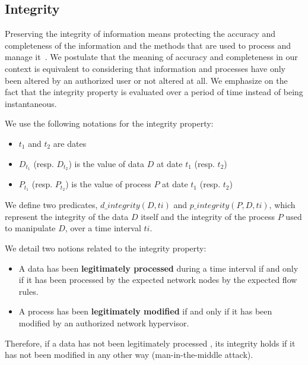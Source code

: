 \subsection{Integrity}
\label{sec:prop-int}
Preserving the integrity of information means protecting the accuracy and completeness of the information and the methods that are used to process and manage it~\cite{ISO/IEC270012013}.
We postulate that the meaning of accuracy and completeness in our context is equivalent to considering that information and processes have only been altered by an authorized user or not altered at all.
We emphasize on the fact that the integrity property is evaluated over a period of time instead of being instantaneous.

We use the following notations for the integrity property:

\begin{itemize}
    \item $t_1$ and $t_2$ are dates
    \item $D_{t_1}$ (resp. $D_{t_2}$) is the value of data $D$ at date $t_1$ (resp. $t_2$)
    \item $P_{t_1}$ (resp. $P_{t_2}$) is the value of process $P$ at date $t_1$ (resp. $t_2$)
\end{itemize}

We define two predicates, $d\_integrity(D,ti)$ and $p\_integrity(P,D,ti)$, which represent  the integrity of the data $D$ itself and the integrity of the process $P$ used to manipulate $D$, over a time interval $ti$. 

We detail two notions related to the integrity property:
\begin{itemize}
    \item A data has been \textbf{legitimately processed} during a time interval if and only if it has been processed by the expected network nodes by the expected flow rules.
    \item A process has been \textbf{legitimately modified} if and only if it has been modified by an authorized network hypervisor.
\end{itemize}


Therefore, if a data has not been legitimately processed , its integrity holds if it has not been modified in any other way (\eg man-in-the-middle attack). 

